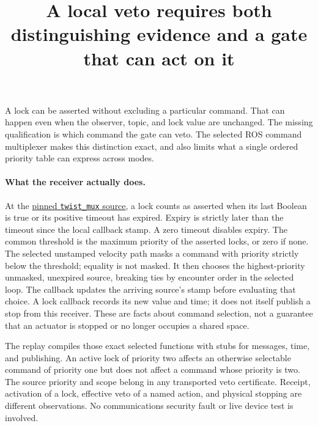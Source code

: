 \documentclass{article}
\title{A local veto requires both distinguishing evidence and a gate that can act on it}
\begin{document}
\maketitle

A lock can be asserted without excluding a particular command. That can happen even when the observer, topic, and lock value are unchanged. The missing qualification is which command the gate can veto. The selected ROS command multiplexer makes this distinction exact, and also limits what a single ordered priority table can express across modes.

\paragraph{What the receiver actually does.}
At the \href{https://github.com/ros-teleop/twist_mux/tree/a8225e2d9bf0171aac447c246376f0981defd17b}{pinned \texttt{twist\_mux} source}, a lock counts as asserted when its last Boolean is true or its positive timeout has expired. Expiry is strictly later than the timeout since the local callback stamp. A zero timeout disables expiry. The common threshold is the maximum priority of the asserted locks, or zero if none. The selected unstamped velocity path masks a command with priority strictly below the threshold; equality is not masked. It then chooses the highest-priority unmasked, unexpired source, breaking ties by encounter order in the selected loop. The callback updates the arriving source's stamp before evaluating that choice. A lock callback records its new value and time; it does not itself publish a stop from this receiver. These are facts about command selection, not a guarantee that an actuator is stopped or no longer occupies a shared space.

The replay compiles those exact selected functions with stubs for messages, time, and publishing. An active lock of priority two affects an otherwise selectable command of priority one but does not affect a command whose priority is two. The source priority and scope belong in any transported veto certificate. Receipt, activation of a lock, effective veto of a named action, and physical stopping are different observations. No communications security fault or live device test is involved.
\end{document}
